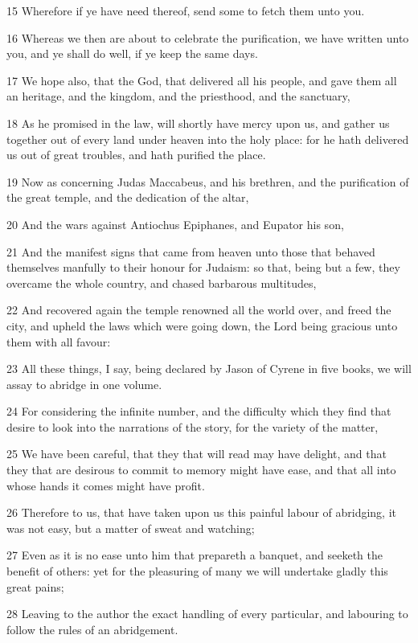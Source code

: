 \par 15 Wherefore if ye have need thereof, send some to fetch them unto you.
\par 16 Whereas we then are about to celebrate the purification, we have written unto you, and ye shall do well, if ye keep the same days.
\par 17 We hope also, that the God, that delivered all his people, and gave them all an heritage, and the kingdom, and the priesthood, and the sanctuary,
\par 18 As he promised in the law, will shortly have mercy upon us, and gather us together out of every land under heaven into the holy place: for he hath delivered us out of great troubles, and hath purified the place.
\par 19 Now as concerning Judas Maccabeus, and his brethren, and the purification of the great temple, and the dedication of the altar,
\par 20 And the wars against Antiochus Epiphanes, and Eupator his son,
\par 21 And the manifest signs that came from heaven unto those that behaved themselves manfully to their honour for Judaism: so that, being but a few, they overcame the whole country, and chased barbarous multitudes,
\par 22 And recovered again the temple renowned all the world over, and freed the city, and upheld the laws which were going down, the Lord being gracious unto them with all favour:
\par 23 All these things, I say, being declared by Jason of Cyrene in five books, we will assay to abridge in one volume.
\par 24 For considering the infinite number, and the difficulty which they find that desire to look into the narrations of the story, for the variety of the matter,
\par 25 We have been careful, that they that will read may have delight, and that they that are desirous to commit to memory might have ease, and that all into whose hands it comes might have profit.
\par 26 Therefore to us, that have taken upon us this painful labour of abridging, it was not easy, but a matter of sweat and watching;
\par 27 Even as it is no ease unto him that prepareth a banquet, and seeketh the benefit of others: yet for the pleasuring of many we will undertake gladly this great pains;
\par 28 Leaving to the author the exact handling of every particular, and labouring to follow the rules of an abridgement.
